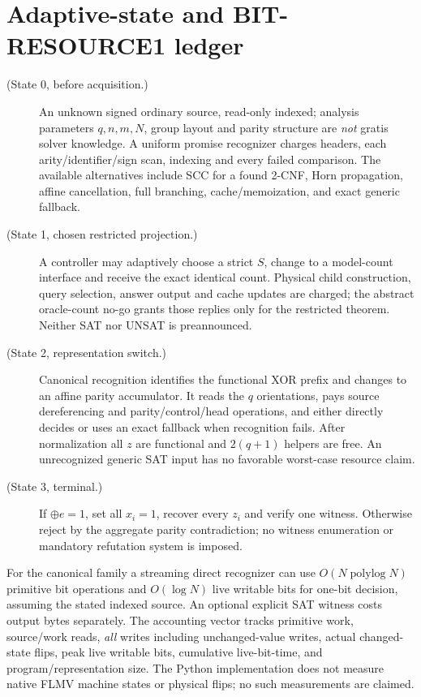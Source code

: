 \documentclass[11pt]{article}
\begin{document}
\section{Adaptive-state and BIT-RESOURCE1 ledger}
\begin{description}
\item[(State 0, before acquisition.)] An unknown signed ordinary source, read-only indexed; analysis parameters $q,n,m,N$, group layout and parity structure are \emph{not} gratis solver knowledge. A uniform promise recognizer charges headers, each arity/identifier/sign scan, indexing and every failed comparison. The available alternatives include SCC for a found 2-CNF, Horn propagation, affine cancellation, full branching, cache/memoization, and exact generic fallback.
\item[(State 1, chosen restricted projection.)] A controller may adaptively choose a strict $S$, change to a model-count interface and receive the exact identical count. Physical child construction, query selection, answer output and cache updates are charged; the abstract oracle-count no-go grants those replies only for the restricted theorem. Neither SAT nor UNSAT is preannounced.
\item[(State 2, representation switch.)] Canonical recognition identifies the functional XOR prefix and changes to an affine parity accumulator. It reads the $q$ orientations, pays source dereferencing and parity/control/head operations, and either directly decides or uses an exact fallback when recognition fails. After normalization all $z$ are functional and $2(q+1)$ helpers are free. An unrecognized generic SAT input has no favorable worst-case resource claim.
\item[(State 3, terminal.)] If $\oplus e=1$, set all $x_i=1$, recover every $z_i$ and verify one witness. Otherwise reject by the aggregate parity contradiction; no witness enumeration or mandatory refutation system is imposed.
\end{description}
For the canonical family a streaming direct recognizer can use $O(N\operatorname{polylog}N)$ primitive bit operations and $O(\log N)$ live writable bits for one-bit decision, assuming the stated indexed source. An optional explicit SAT witness costs output bytes separately. The accounting vector tracks primitive work, source/work reads, \emph{all} writes including unchanged-value writes, actual changed-state flips, peak live writable bits, cumulative live-bit-time, and program/representation size. The Python implementation does not measure native FLMV machine states or physical flips; no such measurements are claimed.
\end{document}
